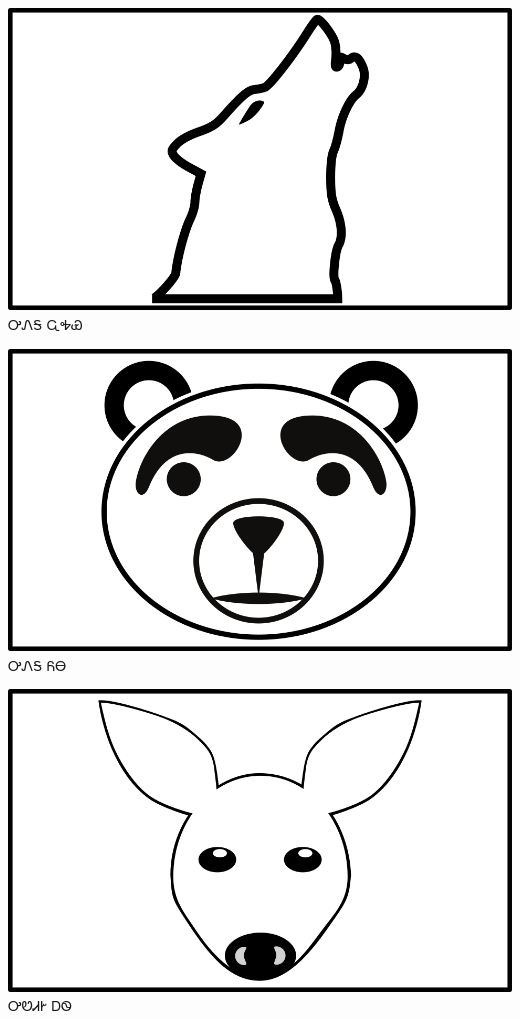 \documentclass[avery5371]{flashcards}%
\begin{document}
    \begin{flashcard}{
        \includegraphics[width=0.95\columnwidth,height=.51\columnwidth,keepaspectratio]{../artwork/objects-animate/wahya}
    }
        \Huge ᎤᏁᎦ ᏩᎭᏯ
    \end{flashcard}

    \begin{flashcard}{
        \includegraphics[width=0.95\columnwidth,height=.51\columnwidth,keepaspectratio]{../artwork/objects-animate/yona}
    }
        \Huge ᎤᏁᎦ ᏲᎾ
    \end{flashcard}

    \begin{flashcard}{
        \includegraphics[width=0.95\columnwidth,height=.51\columnwidth,keepaspectratio]{../artwork/objects-animate/ahwi}
    }
        \Huge ᎤᏬᏗᎨ ᎠᏫ
    \end{flashcard}
\end{document}
